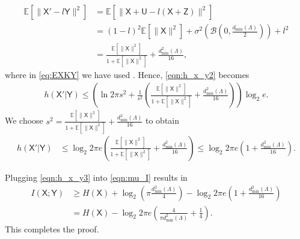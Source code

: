 \documentclass[12pt, draftclsnofoot, onecolumn]{IEEEtran}
\newcommand{\mbb}[1]{\mathbb{#1}}
\newcommand{\msf}[1]{\mathsf{#1}}
\newcommand{\E}{\mathbb{E}}
\theoremstyle{definition}
\begin{document}
\begin{IEEEproof}
\begin{subequations}
\begin{align}
    \mbb{E}[\| \msf{X'}-l\msf{Y}\|^2] &= \mbb{E}[\| \msf{X}+\msf{U}-l(\msf{X}+\msf{Z}) \|^2] \nonumber \\
    &= (1-l)^2 \E[\|\msf{X}\|^2] + \sigma^2\left(\mathcal{B}\left(0,\frac{d_{\min}(\Lambda)}{2}\right)\right) + l^2  \\
    & = \frac{\E[\|\msf{X}\|^2]}{1+\E[\|\msf{X}\|^2]} + \frac{d^2_{\min}(\Lambda)}{16}, \label{eq:EXKY}
\end{align}
\end{subequations}
where in \eqref{eq:EXKY} we have used \cite[Eq. (3)]{Ordentlich16}. Hence, \eqref{eqn:h_x_y2} becomes
\begin{align}
    h(\msf{X'}|\msf{Y}) \leq \left(\ln 2\pi s^2 + \frac{1}{s^2}  \left(\frac{\E[\|\msf{X}\|^2]}{1+\E[\|\msf{X}\|^2]} + \frac{d^2_{\min}(\Lambda)}{16}\right)\right) \log_2 e.
\end{align}
We choose $s^2 = \frac{\E[\|\msf{X}\|^2]}{1+\E[\|\msf{X}\|^2]} + \frac{d^2_{\min}(\Lambda)}{16}$ to obtain
\begin{align}\label{eqn:h_x_y3}
    h(\msf{X'}|\msf{Y}) &\leq \log_2 2\pi e \left(\frac{\E[\|\msf{X}\|^2]}{1+\E[\|\msf{X}\|^2]} + \frac{d^2_{\min}(\Lambda)}{16}\right) %
    \leq \log_2 2\pi e \left(1 + \frac{d^2_{\min}(\Lambda)}{16}\right).
\end{align}

Plugging \eqref{eqn:h_x_y3} into \eqref{eqn:mu_I} results in
\begin{align}
    I(\msf{X};\msf{Y})&\geq H(\msf{X}) + \log_2\left(\pi\frac{d^2_{\min}(\Lambda)}{4}\right) %
      - \log_2 2\pi e \left(1 + \frac{d^2_{\min}(\Lambda)}{16}\right) \nonumber \\
    &= H(\msf{X}) - \log_2 2\pi e \left(\frac{4}{\pi d^2_{\min}(\Lambda)} + \frac{1}{4}\right).
\end{align}
This completes the proof.
\end{IEEEproof}
\end{document}
